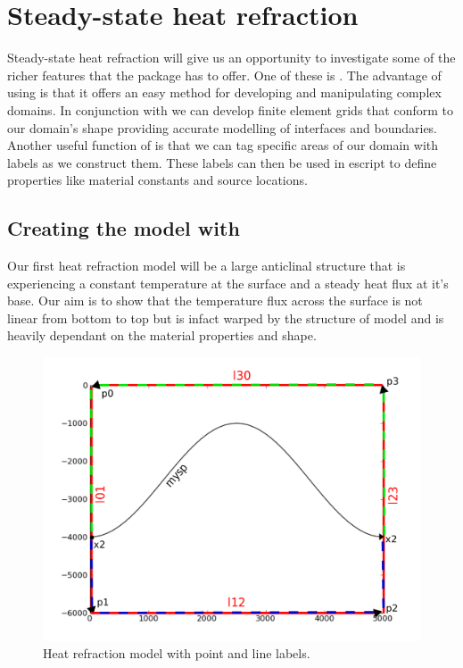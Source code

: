 
%
%
%

\section{Steady-state heat refraction}
Steady-state heat refraction will give us an opportunity to investigate some of the richer features that the \esc package has to offer. One of these is \pycad . The advantage of using \pycad is that it offers an easy method for developing and manipulating complex domains. In conjunction with \gmsh we can develop finite element grids that conform to our domain's shape providing accurate modelling of interfaces and boundaries. Another useful function of \pycad is that we can tag specific areas of our domain with labels as we construct them. These labels can then be used in escript to define properties like material constants and source locations. 

\subsection{Creating the model with \pycad}

Our first heat refraction model will be a large anticlinal structure that is experiencing a constant temperature at the surface and a steady heat flux at it's base. Our aim is to show that the temperature flux across the surface is not linear from bottom to top but is infact warped by the structure of model and is heavily dependant on the material properties and shape.

\begin{figure}[h!]
\centerline{\includegraphics[width=4.in]{figures/anticlineheatrefraction}}
\caption{Heat refraction model with point and line labels.}
\label{fig:anticlinehrmodel}
\end{figure}


